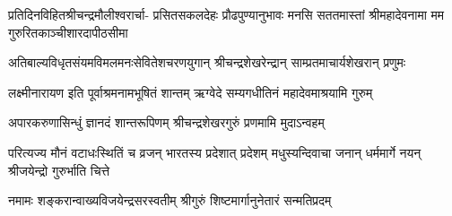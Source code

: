 \fourlineindentedshloka
{प्रतिदिनविहितश्रीचन्द्रमौलीश्वरार्चा-}
{प्रसितसकलदेहः प्रौढपुण्यानुभावः}
{मनसि सततमास्तां श्रीमहादेवनामा}
{मम गुरुरितकाञ्चीशारदापीठसीमा}%

\twolineshloka
{अतिबाल्यविधृतसंयमविमलमनःसेवितेशचरणयुगान्} 
{श्रीचन्द्रशेखरेन्द्रान् साम्प्रतमाचार्यशेखरान् प्रणुमः}%

\twolineshloka
{लक्ष्मीनारायण इति पूर्वाश्रमनामभूषितं शान्तम्} 
{ऋग्वेदे सम्यगधीतिनं महादेवमाश्रयामि गुरुम्}%

\twolineshloka
{अपारकरुणासिन्धुं ज्ञानदं शान्तरूपिणम्} 
{श्रीचन्द्रशेखरगुरुं प्रणमामि मुदाऽन्वहम्}%

\fourlineindentedshloka
{परित्यज्य मौनं वटाधःस्थितिं च}
{व्रजन् भारतस्य प्रदेशात् प्रदेशम्}%
{मधुस्यन्दिवाचा जनान् धर्ममार्गे}
{नयन् श्रीजयेन्द्रो गुरुर्भाति चित्ते}%

\twolineshloka
{नमामः शङ्करान्वाख्यविजयेन्द्रसरस्वतीम्} 
{श्रीगुरुं शिष्टमार्गानुनेतारं सन्मतिप्रदम्}%

\closesub
